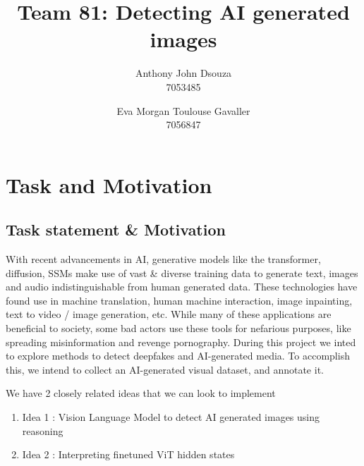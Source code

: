\documentclass[10pt,twocolumn,letterpaper]{article}
\begin{document}
\title{Team 81: Detecting AI generated images}

\author{
Anthony John Dsouza\\
7053485\\
\and
Eva Morgan Toulouse Gavaller\\
7056847\\
}
\maketitle

\section{Task and Motivation}
\subsection{Task statement \& Motivation}
With recent advancements in AI, generative models like the transformer, diffusion, SSMs make use of vast \& diverse training data to generate text, images and audio indistinguishable from human generated data. These technologies have found use in machine translation, human machine interaction, image inpainting, text to video / image generation, etc. While many of these applications are beneficial to society, some bad actors use these tools for nefarious purposes, like spreading misinformation and revenge pornography. 
During this project we inted to explore methods to detect deepfakes and AI-generated media. To accomplish this, we intend to collect an AI-generated visual dataset, and annotate it. 

We have 2 closely related ideas that we can look to implement

\begin{enumerate}
	\item Idea 1 : Vision Language Model to detect AI generated images using reasoning
	\item Idea 2 : Interpreting finetuned ViT hidden states
\end{enumerate}

\end{document}
